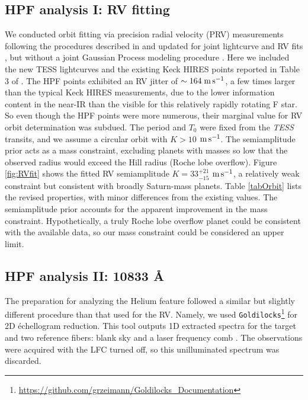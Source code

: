 \documentclass[linenumbers, twocolumn, trackchanges]{aastex631}
\newcommand{\ms}{\ensuremath{\rm m\,s^{-1}}}
\begin{document}
\subsection{HPF analysis I: RV fitting}\label{secRVfit}

We conducted orbit fitting via precision radial velocity (PRV) measurements following the procedures described in \citet{2021AJ....161..173T} and updated for joint lightcurve and RV fits \citep{2022AJ....163..225T}, but without a joint Gaussian Process modeling procedure \citep{2023ApJ...950..162T}.  Here we included the new TESS lightcurves and the existing Keck HIRES points reported in Table 3 of \citet{2017AJ....153..211Z}.  The HPF points exhibited an RV jitter of $\sim164\;\ms$, a few times larger than the typical Keck HIRES measurements, due to the lower information content in the near-IR than the visible for this relatively rapidly rotating F star.  So even though the HPF points were more numerous, their marginal value for RV orbit determination was subdued.  The period and $T_0$ were fixed from the \emph{TESS} transits, and we assume a circular orbit with $K>10$ \ms.  The semiamplitude prior acts as a mass constraint, excluding planets with masses so low that the observed radius would exceed the Hill radius (Roche lobe overflow).  Figure \ref{fig:RVfit} shows the fitted RV semiamplitude $K=33_{-15}^{+21}$ \ms, a relatively weak constraint but consistent with broadly Saturn-mass planets.  Table \ref{tabOrbit} lists the revised properties, with minor differences from the existing values.  The semiamplitude prior accounts for the apparent improvement in the mass constraint.  Hypothetically, a truly Roche lobe overflow planet could be consistent with the available data, so our mass constraint could be considered an upper limit.


\subsection{HPF analysis II:  10833 \AA} \label{secHeAnalysis}
The preparation for analyzing the Helium feature followed a similar but slightly different procedure than that used for the RV. Namely, we used \texttt{Goldilocks}\footnote{\url{https://github.com/grzeimann/Goldilocks_Documentation}} for 2D \'echellogram reduction.  This tool outputs 1D extracted spectra for the target and two reference fibers: blank sky and a laser frequency comb \citep[LFC,][]{2019Optic...6..233M}.  The observations were acquired with the LFC turned off, so this unilluminated spectrum was discarded.
\end{document}

